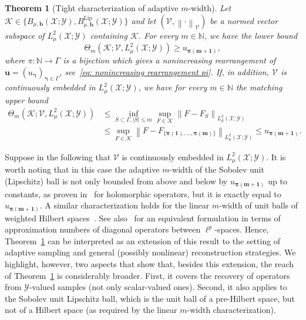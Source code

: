 \documentclass[namedate,webpdf]{ima-authoring-template-blank}
\newcommand*{\Lip}{\mathrm{Lip}}  %
\newcommand*{\nm}[1]{{\left\|#1\right \|}}
\newcommand{\abs}[1]{\left|#1\right|}
\newcounter{counter}
\numberwithin{counter}{section}
\numberwithin{equation}{section}
\theoremstyle{plain}
\newtheorem{theorem}[counter]{Theorem}
\theoremstyle{definition}
\newcommand*{\cK}{\mathcal{K}}
\newcommand*{\cV}{\mathcal{V}}
\newcommand*{\cX}{\mathcal{X}}
\newcommand*{\cY}{\mathcal{Y}}
\newcommand*{\bbN}{\mathbb{N}}
\theoremstyle{thmstyletwo}
\begin{document}
\begin{theorem}[Tight characterization of adaptive \(m\)-width]
\label{thm: adaptive m-width}
    Let \(\cK \in \{ B_{\mu, \bm{b}}(\cX; \cY), B_{\mu, \bm{b}}^{\Lip}(\cX; \cY) \}\) and let \( (\cV, \nm{\cdot}_{\cV}) \) be a normed vector subspace of \( L^2_{\mu}(\cX; \cY) \) containing \( \cK \). For every \(m \in \bbN\), we have the lower bound 
    \[
    \Theta_m(\cK; \cV, L_{\mu}^2(\cX; \cY)) \geq u_{\bm{\pi(m+1)}},
    \]
    where \(\pi: \bbN \to \Gamma\) is a bijection which gives a nonincreasing rearrangement of \(\bm{u} = (u_{\bm{\gamma}})_{\bm{\gamma} \in \Gamma}\), see~\eqref{eq: nonincreasing rearrangement pi}.
    If, in addition, \(\cV\) is continuously embedded in \(L_{\mu}^2(\cX; \cY)\), we have for every \(m \in \bbN\) the matching upper bound
    \begin{align*}
        \Theta_m(\cK; \cV, L_{\mu}^2(\cX; \cY)) 
        &\leq \inf_{S \subset \Gamma, \abs{S} \leq m} \sup_{F \in \cK} \nm{F - F_S}_{L_{\mu}^2(\cX; \cY)} \\
        &\leq \sup_{F \in \cK} \nm{F - F_{\{\bm{\pi(1)}, \dots, \bm{\pi(m)}\}}}_{L_{\mu}^2(\cX; \cY)} 
        \leq u_{\bm{\pi(m+1)}}.
    \end{align*}
\end{theorem}

Suppose in the following that \( \cV \) is continuously embedded in \( L^2_{\mu}(\cX; \cY) \).
It is worth noting that in this case the adaptive \(m\)-width of the Sobolev unit (Lipschitz) ball is not only bounded from above and below by \( u_{\bm{\pi(m + 1)}} \) up to constants, as proven in~\citet{adcock_OptimalApproximationInfinitedimensionalHolomorphic_2024} for holomorphic operators, but it is exactly equal to \( u_{\bm{\pi(m + 1)}} \). 
A similar characterization holds for the linear \(m\)-width of unit balls of weighted Hilbert spaces~\citep[Thm. 2.2]{pinkus_NwidthsApproximationTheory_1985}. See also~\cite[Thm. 11.11.3]{pietsch_OperatorIdeals_1980} for an equivalent formulation in terms of approximation numbers of diagonal operators between \(\ell^p\)-spaces.
Hence, Theorem~\ref{thm: adaptive m-width} can be interpreted as an extension of this result to the setting of adaptive sampling and general (possibly nonlinear) reconstruction strategies. We highlight, however, two aspects that show that, besides this extension, the reach of Theorem~\ref{thm: adaptive m-width} is considerably broader. First, it covers the recovery of operators from \(\cY\)-valued samples (not only scalar-valued ones). Second, it also applies to the Sobolev unit Lipschitz ball, which is the unit ball of a pre-Hilbert space, but not of a Hilbert space (as required by the linear \(m\)-width characterization).
\end{document}
